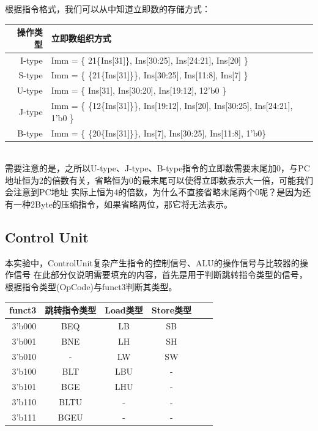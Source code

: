 根据指令格式，我们可以从中知道立即数的存储方式：\\

\begin{tabular}{|r|l|}
    \hline
    操作类型 & 立即数组织方式 \\
    \hline 
    I-type & Imm = \{ {21\{Ins[31]}\}, Ins[30:25], Ins[24:21], Ins[20] \} \\
    \hline
    S-type & Imm = \{ \{21\{Ins[31]\}\}, Ins[30:25], Ins[11:8], Ins[7] \} \\
    \hline
    U-type & Imm = \{ Ins[31], Ins[30:20], Ins[19:12], 12'b0 \} \\
    \hline
    J-type & Imm = \{ \{12\{Ins[31]\}\}, Ins[19:12], Ins[20], Ins[30:25], Ins[24:21], 1'b0 \} \\
    \hline
    B-type & Imm = \{ \{20\{Ins[31]\}\}, Ins[7], Ins[30:25], Ins[11:8], 1'b0\} \\
    \hline
\end{tabular} \\

需要注意的是，之所以U-type、J-type、B-type指令的立即数需要末尾加0，与PC地址恒为2的倍数有关，省略恒为0的最末尾可以使得立即数表示大一倍，可能我们会注意到PC地址
实际上恒为4的倍数，为什么不直接省略末尾两个0呢？是因为还有一种2Byte的压缩指令，如果省略两位，那它将无法表示。

\subsection{Control Unit}
本实验中，ControlUnit复杂产生指令的控制信号、ALU的操作信号与比较器的操作信号
在此部分仅说明需要填充的内容，首先是用于判断跳转指令类型的信号，根据指令类型(OpCode)与funct3判断其类型。

\begin{tabular}{|r|c|c|c|c|l|}
    \hline
    funct3 & 跳转指令类型 & Load类型 & Store类型 \\
    \hline 
    3'b000 & BEQ & LB &  SB \\
    \hline
    3'b001 & BNE & LH & SH \\
    \hline
    3'b010 & - & LW & SW \\
    \hline
    3'b100 & BLT & LBU & - \\
    \hline
    3'b101 & BGE & LHU & - \\
    \hline
    3'b110 & BLTU & - & - \\
    \hline
    3'b111 & BGEU & - & - \\
    \hline
\end{tabular} \\

